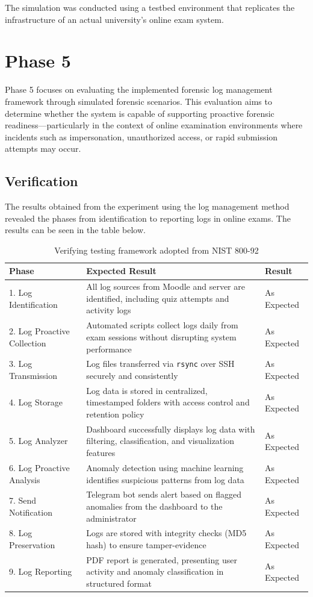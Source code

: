 The simulation was conducted using a testbed environment that replicates the infrastructure of an actual university's online exam system.




\section{Phase 5}
Phase 5 focuses on evaluating the implemented forensic log management framework through simulated forensic scenarios. This evaluation aims to determine whether the system is capable of supporting proactive forensic readiness—particularly in the context of online examination environments where incidents such as impersonation, unauthorized access, or rapid submission attempts may occur.
\subsection{Verification}
The results obtained from the experiment using the log management method revealed the phases from identification to reporting logs in online exams. The results can be seen in the table below.

\begin{table}[H]
	\centering
	\caption{Verifying testing framework adopted from NIST 800-92}
	\begin{tabular}{|p{3.2cm}|p{6cm}|p{4cm}|}
		\hline
		\textbf{Phase} & \textbf{Expected Result} & \textbf{Result} \\ \hline
		1. Log Identification & All log sources from Moodle and server are identified, including quiz attempts and activity logs & As Expected \\ \hline
		2. Log Proactive Collection & Automated scripts collect logs daily from exam sessions without disrupting system performance & As Expected \\ \hline
		3. Log Transmission & Log files transferred via \texttt{rsync} over SSH securely and consistently & As Expected \\ \hline
		4. Log Storage & Log data is stored in centralized, timestamped folders with access control and retention policy & As Expected \\ \hline
		5. Log Analyzer & Dashboard successfully displays log data with filtering, classification, and visualization features & As Expected \\ \hline
		6. Log Proactive Analysis & Anomaly detection using machine learning identifies suspicious patterns from log data & As Expected \\ \hline
		7. Send Notification & Telegram bot sends alert based on flagged anomalies from the dashboard to the administrator & As Expected \\ \hline
		8. Log Preservation & Logs are stored with integrity checks (MD5 hash) to ensure tamper-evidence & As Expected \\ \hline
		9. Log Reporting & PDF report is generated, presenting user activity and anomaly classification in structured format & As Expected \\ \hline
	\end{tabular}
	\label{tab:verifying_log_framework}
\end{table}



